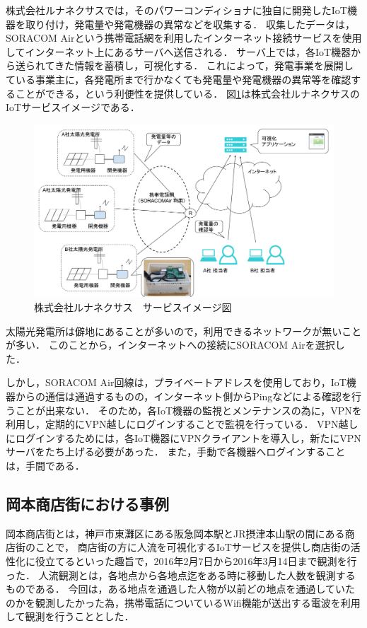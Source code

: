 株式会社ルナネクサスでは，そのパワーコンディショナに独自に開発したIoT機器を取り付け，発電量や発電機器の異常などを収集する．
収集したデータは，SORACOM Airという携帯電話網を利用したインターネット接続サービスを使用してインターネット上にあるサーバへ送信される．
サーバ上では，各IoT機器から送られてきた情報を蓄積し，可視化する．
これによって，発電事業を展開している事業主に，各発電所まで行かなくても発電量や発電機器の異常等を確認することができる，という利便性を提供している．
図\ref{fig:lunafig}は株式会社ルナネクサスのIoTサービスイメージである．
\begin{figure}[htbp]
\includegraphics[width=16cm]{images/lunafig.png}
\caption{株式会社ルナネクサス　サービスイメージ図}
\label{fig:lunafig}
\end{figure}
太陽光発電所は僻地にあることが多いので，利用できるネットワークが無いことが多い．
このことから，インターネットへの接続にSORACOM Airを選択した．
\medskip

しかし，SORACOM Air回線は，プライベートアドレスを使用しており，IoT機器からの通信は通過するものの，インターネット側からPingなどによる確認を行うことが出来ない．
そのため，各IoT機器の監視とメンテナンスの為に，VPNを利用し，定期的にVPN越しにログインすることで監視を行っている．
VPN越しにログインするためには，各IoT機器にVPNクライアントを導入し，新たにVPNサーバをたち上げる必要があった．
また，手動で各機器へログインすることは，手間である．

\subsection{岡本商店街における事例}
岡本商店街とは，神戸市東灘区にある阪急岡本駅とJR摂津本山駅の間にある商店街のことで，
商店街の方に人流を可視化するIoTサービスを提供し商店街の活性化に役立てるといった趣旨で，2016年2月7日から2016年3月14日まで観測を行った．
人流観測とは，各地点から各地点迄をある時に移動した人数を観測するものである．
今回は，ある地点を通過した人物が以前どの地点を通過していたのかを観測したかった為，携帯電話についているWifi機能が送出する電波を利用して観測を行うこととした．
\medskip

